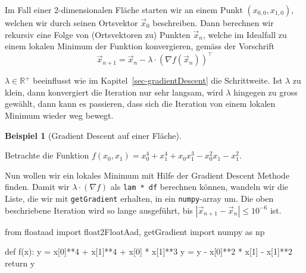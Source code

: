 \documentclass[
  a4paper,
  DIV=11]{scrreprt}
\newenvironment{Shaded}{\begin{snugshade}}{\end{snugshade}}
\newcommand{\ControlFlowTok}[1]{\textcolor[rgb]{0.00,0.23,0.31}{#1}}
\newcommand{\DecValTok}[1]{\textcolor[rgb]{0.68,0.00,0.00}{#1}}
\newcommand{\ImportTok}[1]{\textcolor[rgb]{0.00,0.46,0.62}{#1}}
\newcommand{\KeywordTok}[1]{\textcolor[rgb]{0.00,0.23,0.31}{#1}}
\newcommand{\NormalTok}[1]{\textcolor[rgb]{0.00,0.23,0.31}{#1}}
\newcommand{\OperatorTok}[1]{\textcolor[rgb]{0.37,0.37,0.37}{#1}}
\theoremstyle{definition}
\theoremstyle{definition}
\newtheorem{example}{Beispiel}[chapter]
\theoremstyle{remark}
\begin{document}
Im Fall einer 2-dimensionalen Fläche starten wir an einem Punkt
\((x_{0,0}, x_{1,0})\), welchen wir durch seinen Ortsvektor
\(\vec{x}_0\) beschreiben. Dann berechnen wir rekursiv eine Folge von
(Ortsvektoren zu) Punkten \(\vec{x}_n\), welche im Idealfall zu einem
lokalen Minimum der Funktion konvergieren, gemäss der Vorschrift \[
\vec{x}_{n+1} = \vec{x}_n - \lambda\cdot(\nabla f(\vec{x}_n))^\intercal
\]

\(\lambda\in\mathbb{R}^+\) beeinflusst wie im
Kapitel~\ref{sec-gradientDescent} die Schrittweite. Ist \(\lambda\) zu
klein, dann konvergiert die Iteration nur sehr langsam, wird \(\lambda\)
hingegen zu gross gewählt, dann kann es passieren, dass sich die
Iteration von einem lokalen Minimum wieder weg bewegt.

\begin{example}[Gradient Descent auf einer
Fläche]\protect\hypertarget{exm-gradientDescentWithAAD}{}\label{exm-gradientDescentWithAAD}

Betrachte die Funktion
\(f(x_0, x_1) = x_0^4 + x_1^4 + x_0 x_1^3 - x_0^2 x_1 - x_1^2\).

Nun wollen wir ein lokales Minimum mit Hilfe der Gradient Descent
Methode finden. Damit wir \(\lambda \cdot (\nabla f)\) als
\texttt{lam\ *\ df} berechnen können, wandeln wir die Liste, die wir mit
\texttt{getGradient} erhalten, in ein \texttt{numpy}-array um. Die oben
beschriebene Iteration wird so lange ausgeführt, bis
\(|\vec{x}_{n+1}-\vec{x}_n|\le 10^{-6}\) ist.

\begin{Shaded}
\begin{Highlighting}[]
\ImportTok{from}\NormalTok{ floataad }\ImportTok{import}\NormalTok{ float2FloatAad, getGradient}
\ImportTok{import}\NormalTok{ numpy }\ImportTok{as}\NormalTok{ np}

\KeywordTok{def}\NormalTok{ f(x):}
\NormalTok{    y }\OperatorTok{=}\NormalTok{ x[}\DecValTok{0}\NormalTok{]}\OperatorTok{**}\DecValTok{4} \OperatorTok{+}\NormalTok{ x[}\DecValTok{1}\NormalTok{]}\OperatorTok{**}\DecValTok{4} \OperatorTok{+}\NormalTok{ x[}\DecValTok{0}\NormalTok{] }\OperatorTok{*}\NormalTok{ x[}\DecValTok{1}\NormalTok{]}\OperatorTok{**}\DecValTok{3}
\NormalTok{    y }\OperatorTok{=}\NormalTok{ y }\OperatorTok{{-}}\NormalTok{ x[}\DecValTok{0}\NormalTok{]}\OperatorTok{**}\DecValTok{2} \OperatorTok{*}\NormalTok{ x[}\DecValTok{1}\NormalTok{] }\OperatorTok{{-}}\NormalTok{ x[}\DecValTok{1}\NormalTok{]}\OperatorTok{**}\DecValTok{2}
    \ControlFlowTok{return}\NormalTok{ y}


\end{Highlighting}
\end{Shaded}
\end{example}
\end{document}
